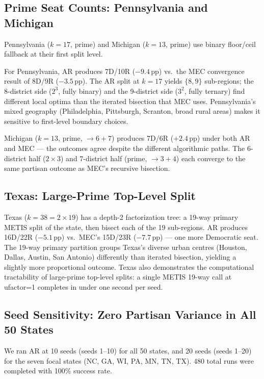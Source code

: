 \subsection{Prime Seat Counts: Pennsylvania and Michigan}
\label{sec:eval:prime}

Pennsylvania ($k = 17$, prime) and Michigan ($k = 13$, prime) use binary
floor/ceil fallback at their first split level.

For Pennsylvania, AR produces 7D/10R ($-9.4$\,pp) vs.\ the MEC convergence
result of 8D/9R ($-3.5$\,pp). The AR split at $k=17$ yields $\{8, 9\}$
sub-regions; the 8-district side ($2^3$, fully binary) and the 9-district side
($3^2$, fully ternary) find different local optima than the iterated bisection
that MEC uses. Pennsylvania's mixed geography (Philadelphia, Pittsburgh, Scranton,
broad rural areas) makes it sensitive to first-level boundary choices.

Michigan ($k = 13$, prime, $\to 6+7$) produces 7D/6R ($+2.4$\,pp) under both
AR and MEC --- the outcomes agree despite the different algorithmic paths. The
6-district half ($2 \times 3$) and 7-district half (prime, $\to 3+4$) each
converge to the same partisan outcome as MEC's recursive bisection.

\subsection{Texas: Large-Prime Top-Level Split}
\label{sec:eval:texas}

Texas ($k = 38 = 2 \times 19$) has a depth-2 factorization tree: a 19-way
primary METIS split of the state, then bisect each of the 19 sub-regions.
AR produces 16D/22R ($-5.1$\,pp) vs.\ MEC's 15D/23R ($-7.7$\,pp) --- one
more Democratic seat. The 19-way primary partition groups Texas's diverse urban
centres (Houston, Dallas, Austin, San Antonio) differently than iterated
bisection, yielding a slightly more proportional outcome. Texas also demonstrates
the computational tractability of large-prime top-level splits: a single METIS
19-way call at ufactor=1 completes in under one second per seed.

\subsection{Seed Sensitivity: Zero Partisan Variance in All 50 States}
\label{sec:eval:seeds}

We ran AR at 10 seeds (seeds 1--10) for all 50 states, and 20 seeds
(seeds 1--20) for the seven focal states (NC, GA, WI, PA, MN, TN, TX).
480 total runs were completed with 100\% success rate.

